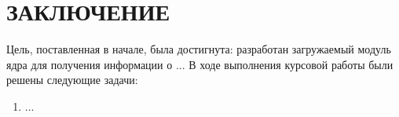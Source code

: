 \chapter*{ЗАКЛЮЧЕНИЕ}

Цель, поставленная в начале, была достигнута: разработан загружаемый модуль ядра для получения информации о ...
В ходе выполнения курсовой работы были решены следующие задачи:
\begin{enumerate}
	\item ...
\end{enumerate}


